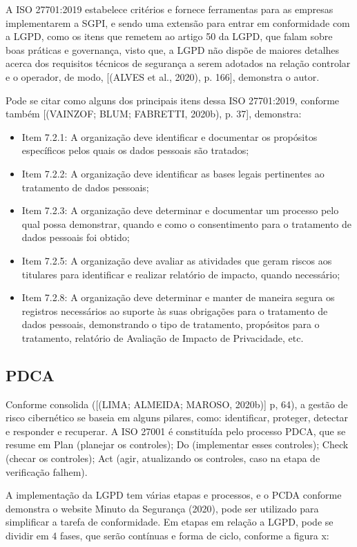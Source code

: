 \documentclass[
	12pt,				%
	openright,			%
	oneside,			%
	a4paper,			%
	english,			%
	french,				%
	spanish,			%
	brazil,				%
	]{abntex2}
\begin{document}
A ISO 27701:2019 estabelece critérios e fornece ferramentas para as empresas implementarem a SGPI, e sendo uma extensão para entrar em conformidade com a LGPD, como os itens que remetem ao artigo 50 da LGPD, que falam sobre boas práticas e governança, visto que, a LGPD não dispõe de maiores detalhes acerca dos requisitos técnicos de segurança a serem adotados na relação controlar e o operador, de modo, [(ALVES et al., 2020), p. 166], demonstra o autor. 

 Pode se citar como alguns dos principais itens dessa ISO 27701:2019, conforme também [(VAINZOF; BLUM; FABRETTI, 2020b), p. 37], demonstra:
\begin{itemize}
\item Item 7.2.1: A organização deve identificar e documentar os propósitos específicos pelos quais os dados pessoais são tratados;
\item Item 7.2.2: A organização deve identificar as bases legais pertinentes ao tratamento de dados pessoais;
\item Item 7.2.3: A organização deve determinar e documentar um processo pelo qual possa demonstrar, quando e como o consentimento para o  tratamento de dados pessoais foi obtido;
\item Item 7.2.5: A organização deve avaliar as atividades que geram riscos aos titulares para identificar e realizar relatório de impacto, quando necessário;
\item Item 7.2.8: A organização deve determinar e manter de maneira segura os registros necessários ao suporte às suas obrigações para o tratamento de dados pessoais, demonstrando o tipo de tratamento, propósitos para o tratamento, relatório de Avaliação de Impacto de Privacidade, etc.
\end{itemize}

\subsection{ PDCA }

Conforme consolida ([(LIMA; ALMEIDA; MAROSO, 2020b)] p, 64), a gestão de risco cibernético se baseia em alguns pilares, como: identificar, proteger, detectar e responder e recuperar. A ISO 27001 é constituída pelo processo PDCA, que se resume em Plan (planejar os controles); Do (implementar esses controles); Check (checar os controles); Act (agir, atualizando os controles, caso na etapa de verificação falhem).

A implementação da LGPD tem várias etapas e processos, e o PCDA conforme demonstra o website Minuto da Segurança (2020), pode ser utilizado para simplificar a tarefa de conformidade. Em etapas em relação a LGPD, pode se dividir em 4 fases, que serão contínuas e forma de ciclo, conforme a figura x:
\end{document}
